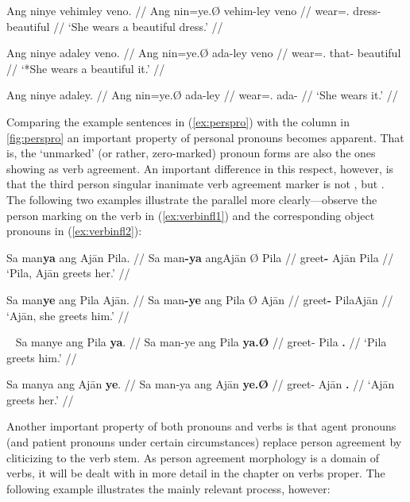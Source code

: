 \pex\label{ex:procompldist}
\a\begingl
	\gla Ang ninye vehimley veno. //
	\glb Ang nin=ye.Ø vehim-ley veno //
	\glc \Aarg{} wear=\TsgF{}.\Top{} dress-\PargI{} beautiful //
	\glft `She wears a beautiful dress.' //
\endgl

\a\ljudge* \begingl
	\gla Ang ninye adaley veno. //
	\glb Ang nin=ye.Ø ada-ley veno //
	\glc \Aarg{} wear=\TsgF{}.\Top{} that-\PargI{} beautiful //
	\glft `*She wears a beautiful it.' //
\endgl

\a\begingl
	\gla Ang ninye adaley. //
	\glb Ang nin=ye.Ø ada-ley //
	\glc \Aarg{} wear=\TsgF{}.\Top{} ada-\PargI{} //
	\glft `She wears it.' //
\endgl

\xe

Comparing the example sentences in (\ref{ex:perspro}) with the \Top{} column in 
\autoref{fig:perspro} an important property of personal pronouns becomes 
apparent. That is, the `unmarked' (or rather, zero-marked) pronoun forms are 
also the ones showing as verb agreement. An important difference in this 
respect, however, is that the third person singular inanimate verb agreement 
marker is not , but . The following two examples 
illustrate the parallel more clearly---observe the person marking on the verb 
in (\ref{ex:verbinfl1}) and the corresponding object pronouns in 
(\ref{ex:verbinfl2}):

\pex\label{ex:verbinfl1}
\a\begingl
	\gla Sa man\textbf{ya} ang Ajān {} Pila. //
	\glb Sa man\textbf{-ya} ang ​Ajān Ø ​Pila //
	\glc \PatT{} greet\textbf{-\TsgM{}} \Aarg{} ​Ajān \Top{} ​Pila //
	\glft `Pila, Ajān greets her.' //
\endgl

\a\begingl
	\gla Sa man\textbf{ye} ang Pila {} Ajān. //
	\glb Sa man\textbf{-ye} ang Pila Ø ​Ajān //
	\glc \PatT{} greet\textbf{-\TsgF{}} \Aarg{} Pila \Top{} ​Ajān //
	\glft `Ajān, she greets him.' //
\endgl

\xe

\pex~\label{ex:verbinfl2}
\a\begingl
	\gla Sa manye ang Pila \textbf{ya}. //
	\glb Sa man-ye ang Pila \textbf{ya.Ø} //
	\glc \PatT{} greet-\TsgF{} \Aarg{} Pila \textbf{\TsgM{}.\Top{}} //
	\glft `Pila greets him.' //
\endgl

\a\begingl
	\gla Sa manya ang Ajān \textbf{ye}. //
	\glb Sa man-ya ang ​Ajān \textbf{ye.Ø} //
	\glc \PatT{} greet-\TsgM{} \Aarg{} ​Ajān \textbf{\TsgF{}.\Top{}} //
	\glft `Ajān greets her.' //
\endgl

\xe

Another important property of both pronouns and verbs is that agent pronouns 
(and patient pronouns under certain circumstances) replace person agreement by 
cliticizing to the verb stem. As person agreement morphology is a domain of 
verbs, it will be dealt with in more detail in the chapter on verbs proper. The 
following example illustrates the mainly relevant process, however:

